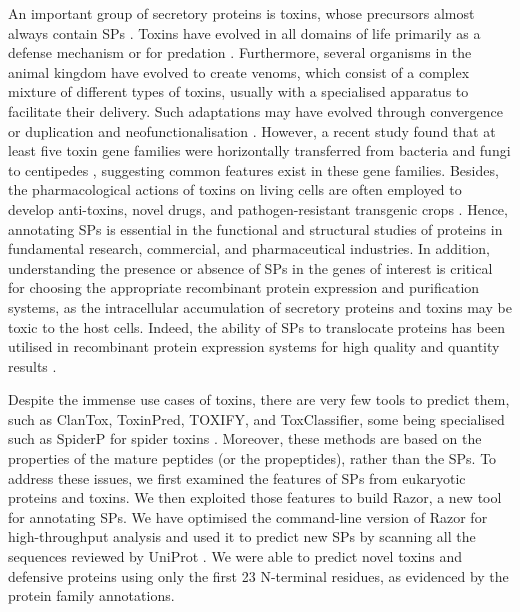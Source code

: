 An important group of secretory proteins is toxins, whose precursors almost always contain SPs \cite{Fry2009-iu}. Toxins have evolved in all domains of life primarily as a defense mechanism or for predation \cite{Casewell2013-pe}. Furthermore, several organisms in the animal kingdom have evolved to create venoms, which consist of a complex mixture of different types of toxins, usually with a specialised apparatus to facilitate their delivery. Such adaptations may have evolved through convergence or duplication and neofunctionalisation \cite{Casewell2020-qg}. However, a recent study found that at least five toxin gene families were horizontally transferred from bacteria and fungi to centipedes \cite{Undheim2021-eg}, suggesting common features exist in these gene families. Besides, the pharmacological actions of toxins on living cells are often employed to develop anti-toxins, novel drugs, and pathogen-resistant transgenic crops \cite{King2011-vf,Estrada2007-ij,Bidondo2019-zf,Samy2017-yi,Li2018-sr}. Hence, annotating SPs is essential in the functional and structural studies of proteins in fundamental research, commercial, and pharmaceutical industries. In addition, understanding the presence or absence of SPs in the genes of interest is critical for choosing the appropriate recombinant protein expression and purification systems, as the intracellular accumulation of secretory proteins and toxins may be toxic to the host cells. Indeed, the ability of SPs to translocate proteins has been utilised in recombinant protein expression systems for high quality and quantity results \cite{Futatsumori-Sugai2010-iu,Cho2019-dq,Karyolaimos2019-ip,Peng2019-xc}.

Despite the immense use cases of toxins, there are very few tools to predict them, such as ClanTox, ToxinPred, TOXIFY, and ToxClassifier, some being specialised such as SpiderP for spider toxins \cite{Naamati2010-vc,Gupta2013-fw,Wong2013-qh,Gacesa2016-fl,Cole2019-bp}. Moreover, these methods are based on the properties of the mature peptides (or the propeptides), rather than the SPs. To address these issues, we first examined the features of SPs from eukaryotic proteins and toxins. We then exploited those features to build Razor, a new tool for annotating SPs. We have optimised the command-line version of Razor for high-throughput analysis and used it to predict new SPs by scanning all the sequences reviewed by UniProt \cite{UniProt_Consortium2019-ch}. We were able to predict novel toxins and defensive proteins using only the first 23 N-terminal residues, as evidenced by the protein family annotations.

